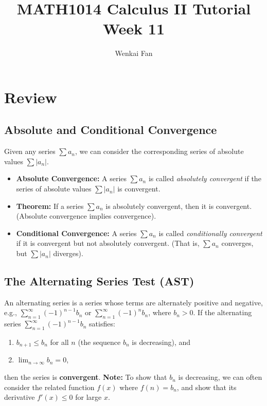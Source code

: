 \documentclass[11pt]{article}
\title{\vspace{-1.0em}MATH1014 Calculus II Tutorial\\Week 11}
\author{Wenkai Fan}
\date{}
\theoremstyle{definition}
\begin{document}
\maketitle
\thispagestyle{fancy}

\section{Review}

\subsection{Absolute and Conditional Convergence}
Given any series $\sum a_n$, we can consider the corresponding series of absolute values $\sum |a_n|$.
\begin{itemize}
    \item \textbf{Absolute Convergence:} A series $\sum a_n$ is called \textit{absolutely convergent} if the series of absolute values $\sum |a_n|$ is convergent.
    \item \textbf{Theorem:} If a series $\sum a_n$ is absolutely convergent, then it is convergent. (Absolute convergence implies convergence).
    \item \textbf{Conditional Convergence:} A series $\sum a_n$ is called \textit{conditionally convergent} if it is convergent but not absolutely convergent. (That is, $\sum a_n$ converges, but $\sum |a_n|$ diverges).
\end{itemize}

\subsection{The Alternating Series Test (AST)}
An alternating series is a series whose terms are alternately positive and negative, e.g., $\sum_{n=1}^\infty (-1)^{n-1} b_n$ or $\sum_{n=1}^\infty (-1)^n b_n$, where $b_n > 0$.
If the alternating series $\sum_{n=1}^\infty (-1)^{n-1} b_n$ satisfies:
\begin{enumerate}
    \item $b_{n+1} \le b_n$ for all $n$ (the sequence $b_n$ is decreasing), and
    \item $\lim_{n \to \infty} b_n = 0$,
\end{enumerate}
then the series is \textbf{convergent}.
\textbf{Note:} To show that $b_n$ is decreasing, we can often consider the related function $f(x)$ where $f(n) = b_n$, and show that its derivative $f'(x) \le 0$ for large $x$.
\end{document}
